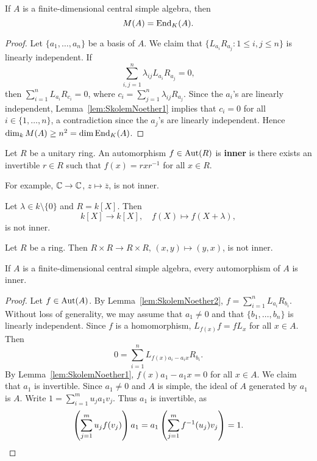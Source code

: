 \begin{lemma}
	\label{lem:SkolemNoether2}
	If $A$ is a finite-dimensional central simple algebra, then 
        \[
        M(A)=\operatorname{End}_K(A).
        \]
\end{lemma}

\begin{proof}
	Let $\{a_1,\dots,a_n\}$ be a basis of $A$. We claim that  
	$\{L_{a_i}R_{a_j}:1\leq i,j\leq n\}$ is linearly independent. If 
	\[
        \sum_{i,j=1}^n\lambda_{ij}L_{a_i}R_{a_j}=0,
        \]
        then 
	$\sum_{i=1}^nL_{a_i}R_{c_i}=0$, where
	$c_i=\sum_{j=1}^n\lambda_{ij}R_{a_j}$. Since the $a_i$'s are linearly 
 independent, Lemma~\ref{lem:SkolemNoether1} implies that $c_i=0$ for all 
	 $i\in\{1,\dots,n\}$, a contradiction since the $a_j$'s are linearly independent.   
	Hence $\dim_kM(A)\geq n^2=\dim\operatorname{End}_K(A)$.
\end{proof}

\begin{definition}
	Let $R$ be a unitary ring. An automorphism $f\in\operatorname{Aut}(R)$ is 
	\textbf{inner} is there exists an invertible $r\in R$ such that 
	$f(x)=rxr^{-1}$ for all $x\in R$.
\end{definition}

For example, $\mathbb{C}\to\mathbb{C}$, $z\mapsto\overline{z}$, is not inner.

\begin{example}
	Let $\lambda\in k\setminus\{0\}$ and $R=k[X]$. Then 
 \[
 k[X]\to
	k[X],\quad f(X)\mapsto f(X+\lambda),
 \]
 is not inner. 
\end{example}

\begin{example}
	Let $R$ be a ring. Then $R\times R\to R\times R$, $(x,y)\mapsto
	(y,x)$, is not inner. 
\end{example}

\begin{theorem}
	\label{thm:SkolemNoether}
	If $A$ is a finite-dimensional central simple algebra, 
        every automorphism of $A$ is inner. 
\end{theorem}

\begin{proof}	
	Let $f\in\operatorname{Aut}(A)$. By Lemma~\ref{lem:SkolemNoether2}, 
	$f=\sum_{i=1}^n	L_{a_i}R_{b_i}$. 
	Without loss of generality, we may assume that  $a_1\ne 0$ and 
	that $\{b_1,\dots,b_n\}$ is linearly independent. 
	Since $f$ is a homomorphism, 
 	$L_{f(x)}f=fL_x$ for all $x\in A$. Then 
	\[
		0=\sum_{i=1}^n L_{f(x)a_i-a_ix}R_{b_i}. 
	\]
	By Lemma~\ref{lem:SkolemNoether1}, $f(x)a_1-a_1x=0$ for all 
	$x\in A$. We claim that $a_1$ is invertible. 
	Since $a_1\ne 0$ and $A$ is simple, the ideal of $A$ generated by $a_1$ is $A$.
        Write $1=\sum_{i=1}^m u_ja_1v_j$. Thus $a_1$ is invertible, 
        as  
	\[
		\left(\sum_{j=1}^m u_jf(v_j)\right)a_1=a_1\left(\sum_{j=1}^m f^{-1}(u_j)v_j\right)=1.\qedhere
	\]
\end{proof}


